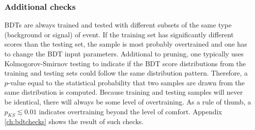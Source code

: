 \subsubsection{Additional checks}
\noindent BDTs are always trained and tested with different subsets of the same type (background or signal) of event. If the training set has significantly different scores than the testing set, the sample is most probably overtrained and one has to change the BDT input parameters. Additional to pruning, one typically uses Kolmogorov-Smirnov testing to indicate if the BDT score distributions from the training and testing sets could follow the same distribution pattern. Therefore, a $p$-value equal to the statistical probability that two samples are drawn from the same distribution is computed. Because training and testing samples will never be identical, there will always be some level of overtraining. As a rule of thumb, a $p_{KS} \lesssim 0.01$ indicates overtraining beyond the level of comfort. Appendix \ref{ch:bdtchecks} shows the result of such checks.
	

